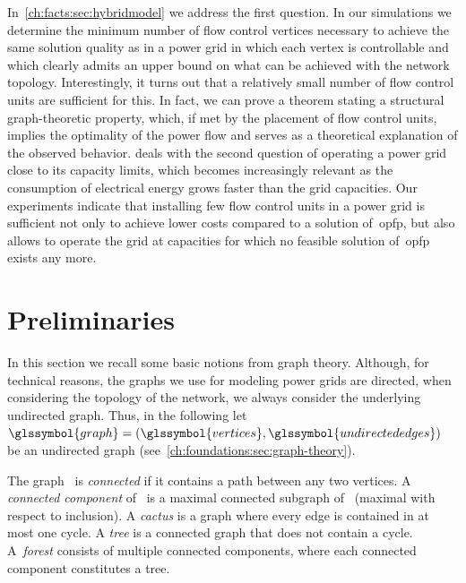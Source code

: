 In~\cref{ch:facts:sec:hybridmodel} we address the first question. In our
simulations we determine the minimum number of flow control vertices necessary
to achieve the same solution quality as in a power grid in which each vertex is
controllable and which clearly admits an upper bound on what can be achieved
with the network topology.
% 
% 
Interestingly, it turns out that a relatively small number of flow control units
are sufficient for this. In fact, we can prove a theorem stating a structural
graph-theoretic property, which, if met by the placement of flow control units,
implies the optimality of the power flow and serves as a theoretical explanation
of the observed behavior.
 deals with the
second question of operating a power grid close to its capacity limits, which
becomes increasingly relevant as the consumption of electrical energy grows
faster than the grid capacities. Our experiments indicate that installing few
flow control units in a power grid is sufficient not only to achieve lower costs
compared to a solution of~\gls{opfp}, but also allows to operate the grid at
capacities for which no feasible solution of~\gls{opfp} exists any more.
%
\section{Preliminaries}%
\label{ch:facts:sec:preliminaries}%
% 
In this section we recall some basic notions from graph theory. Although, for
technical reasons, the graphs we use for modeling power grids are directed, when
considering the topology of the network, we always consider the underlying
undirected graph. Thus, in the following let~$
    \glssymbol{graph} 
    = (
    \glssymbol{vertices},
    \glssymbol{undirectededges})
$ be an undirected graph (see~\cref{ch:foundations:sec:graph-theory}).

The graph~ is \emph{connected} if it contains a path between
any two vertices. A \emph{connected component} of~ is a maximal
connected subgraph of~ (maximal with respect to inclusion). A
\emph{cactus} is a graph where every edge is contained in at most one cycle. A
\emph{tree} is a connected graph that does not contain a cycle. A~\emph{forest}
consists of multiple connected components, where each connected component
constitutes a tree.

